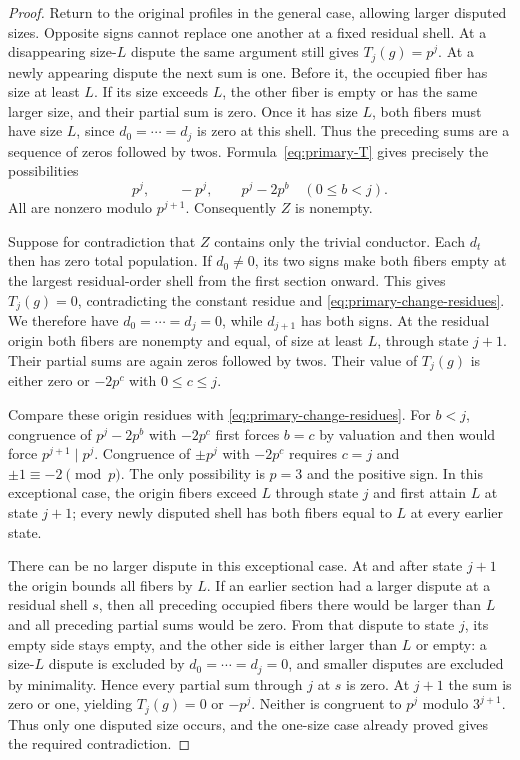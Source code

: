\begin{proof}
Return to the original profiles in the general case, allowing larger
disputed sizes.
Opposite signs cannot replace one another at a fixed residual shell.
At a disappearing size-\(L\) dispute the same argument still gives
\(T_j(g)=p^j\). At a newly appearing dispute the next sum is one.
Before it, the occupied fiber has size at least \(L\). If its size
exceeds \(L\), the other fiber is empty or has the same larger size,
and their partial sum is zero. Once it has size \(L\), both fibers
must have size \(L\), since \(d_0=\cdots=d_j\) is zero at this
shell. Thus the preceding sums are a sequence of zeros followed by
twos. Formula~\eqref{eq:primary-T} gives precisely the possibilities
\begin{equation}
p^j,\qquad -p^j,\qquad p^j-2p^b\quad(0\le b<j).
\label{eq:primary-change-residues}
\end{equation}
All are nonzero modulo \(p^{j+1}\). Consequently \(Z\) is nonempty.

Suppose for contradiction that \(Z\) contains only the trivial
conductor. Each \(d_t\) then has zero total population. If
\(d_0\ne0\), its two signs make both fibers empty at the largest
residual-order shell from the first section onward. This gives
\(T_j(g)=0\), contradicting the constant residue and
\eqref{eq:primary-change-residues}. We therefore have
\(d_0=\cdots=d_j=0\), while \(d_{j+1}\) has both signs.
At the residual origin both fibers are nonempty and equal, of size at
least \(L\), through state \(j+1\). Their partial sums are again
zeros followed by twos. Their value of \(T_j(g)\) is either zero
or \(-2p^c\) with \(0\le c\le j\).

Compare these origin residues with \eqref{eq:primary-change-residues}.
For \(b<j\), congruence of \(p^j-2p^b\) with \(-2p^c\)
first forces \(b=c\) by valuation and then would force
\(p^{j+1}\mid p^j\). Congruence of \(\pm p^j\) with
\(-2p^c\) requires \(c=j\) and \(\pm1\equiv-2\pmod p\).
The only possibility is \(p=3\) and the positive sign.
In this exceptional case, the origin fibers exceed \(L\) through
state \(j\) and first attain \(L\) at state \(j+1\); every newly
disputed shell has both fibers equal to \(L\) at every earlier state.

There can be no larger dispute in this exceptional case. At and after
state \(j+1\) the origin bounds all fibers by \(L\). If an earlier
section had a larger dispute at a residual shell \(s\), then all
preceding occupied fibers there would be larger than \(L\) and all
preceding partial sums would be zero. From that dispute to state
\(j\), its empty side stays empty, and the other side is either
larger than \(L\) or empty: a size-\(L\) dispute is excluded by
\(d_0=\cdots=d_j=0\), and smaller disputes are excluded by minimality.
Hence every partial sum through \(j\) at \(s\) is zero. At
\(j+1\) the sum is zero or one, yielding \(T_j(g)=0\) or
\(-p^j\). Neither is congruent to \(p^j\) modulo \(3^{j+1}\).
Thus only one disputed size occurs, and the one-size case already
proved gives the required contradiction.
\end{proof}

